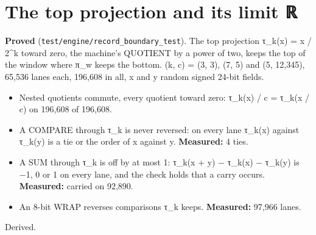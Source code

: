 \section{\texorpdfstring{The top projection and its limit ℝ}{The top projection and its limit ℝ}}

\textbf{Proved} (\texttt{test/\allowbreak{}engine/\allowbreak{}record\_\allowbreak{}boundary\_\allowbreak{}test}). The top projection τ\_\allowbreak{}k(x) = x / 2\textasciicircum{}k toward zero, the machine's QUOTIENT by a power of two, keeps the top of the window where π\_\allowbreak{}w keeps the bottom. (k, c) = (3, 3), (7, 5) and (5, 12,345), 65,536 lanes each, 196,608 in all, x and y random signed 24-bit fields.

\begin{itemize}
\item Nested quotients commute, every quotient toward zero: τ\_\allowbreak{}k(x) / c = τ\_\allowbreak{}k(x / c) on 196,608 of 196,608.
\item A COMPARE through τ\_\allowbreak{}k is never reversed: on every lane τ\_\allowbreak{}k(x) against τ\_\allowbreak{}k(y) is a tie or the order of x against y. \textbf{Measured:} 4 ties.
\item A SUM through τ\_\allowbreak{}k is off by at most 1: τ\_\allowbreak{}k(x + y) − τ\_\allowbreak{}k(x) − τ\_\allowbreak{}k(y) is −1, 0 or 1 on every lane, and the check holds that a carry occurs. \textbf{Measured:} carried on 92,890.
\item An 8-bit WRAP reverses comparisons τ\_\allowbreak{}k keeps. \textbf{Measured:} 97,966 lanes.
\end{itemize}

Derived.

